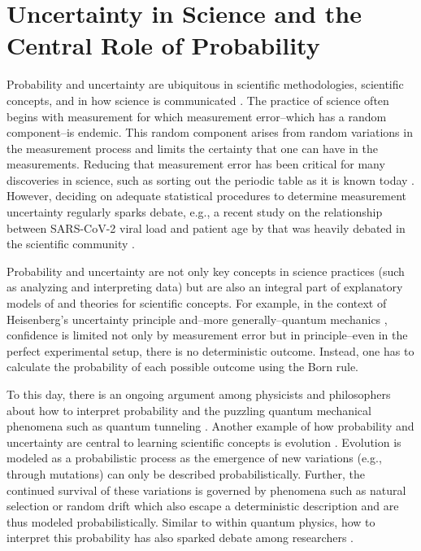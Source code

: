 \documentclass[man]{apa7}
\begin{document}
\section{Uncertainty in Science and the Central Role of Probability}

Probability and uncertainty are ubiquitous in scientific methodologies, scientific concepts, and in how science is communicated \parencite{gsoobmc17}. The practice of science often begins with measurement for which measurement error--which has a random component--is endemic. This random component arises from random variations in the measurement process and limits the certainty that one can have in the measurements. Reducing that measurement error has been critical for many discoveries in science, such as sorting out the periodic table as it is known today \parencite{fco15}. However, deciding on adequate statistical procedures to determine measurement uncertainty regularly sparks debate, e.g., a recent study on the relationship between SARS-CoV-2 viral load and patient age by \textcite{jmvbzhd20} that was heavily debated in the scientific community \parencite{frick_peer-review_2020}.

Probability and uncertainty are not only key concepts in science practices (such as analyzing and interpreting data) but are also an integral part of explanatory models of and theories for scientific concepts. For example, in the context of Heisenberg’s uncertainty principle and--more generally--quantum mechanics \parencite{feynman1951operator}, confidence is limited not only by measurement error but in principle--even in the perfect experimental setup, there is no deterministic outcome. Instead, one has to calculate the probability of each possible outcome using the Born rule. \

To this day, there is an ongoing argument among physicists and philosophers about how to interpret probability and the puzzling quantum mechanical phenomena such as quantum tunneling \parencite{c19}. Another example of how probability and uncertainty are central to learning scientific concepts is evolution \parencite{fsnh19}. Evolution is modeled as a probabilistic process as the emergence of new variations (e.g., through mutations) can only be described probabilistically. Further, the continued survival of these variations is governed by phenomena such as natural selection or random drift which also escape a deterministic description and are thus modeled probabilistically. Similar to within quantum physics, how to interpret this probability has also sparked debate among researchers \parencite{m16}. \\
\end{document}
